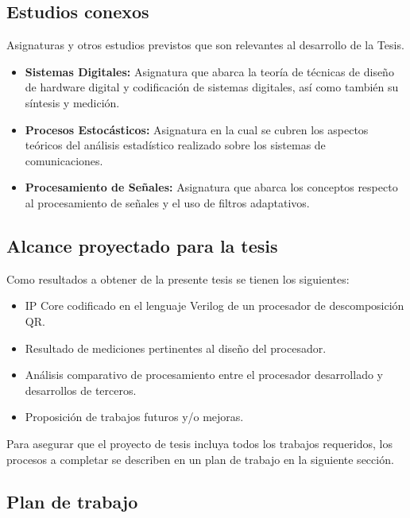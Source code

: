 \documentclass[a4paper]{article}
\begin{document}
\subsection{Estudios conexos}

Asignaturas y otros estudios previstos que son relevantes al desarrollo de la Tesis.

\begin{itemize}
	\item \textbf{Sistemas Digitales:} Asignatura que abarca la teoría de técnicas de diseño de hardware digital y codificación de sistemas digitales, así como también su síntesis y medición.
	\item \textbf{Procesos Estocásticos:} Asignatura en la cual se cubren los aspectos teóricos del análisis estadístico realizado sobre los sistemas de comunicaciones.
	\item \textbf{Procesamiento de Señales:} Asignatura que abarca los conceptos respecto al procesamiento de señales y el uso de filtros adaptativos.
\end{itemize}

\subsection{Alcance proyectado para la tesis}

Como resultados a obtener de la presente tesis se tienen los siguientes:

\begin{itemize}
    \item IP Core codificado en el lenguaje Verilog de un procesador de descomposición QR.
    \item Resultado de mediciones pertinentes al diseño del procesador.
    \item Análisis comparativo de procesamiento entre el procesador desarrollado y desarrollos de terceros.
    \item Proposición de trabajos futuros y/o mejoras.
\end{itemize}

Para asegurar que el proyecto de tesis incluya todos los trabajos requeridos, los procesos a completar se describen en un plan de trabajo en la siguiente sección.

\newpage

\subsection{Plan de trabajo}
\end{document}
